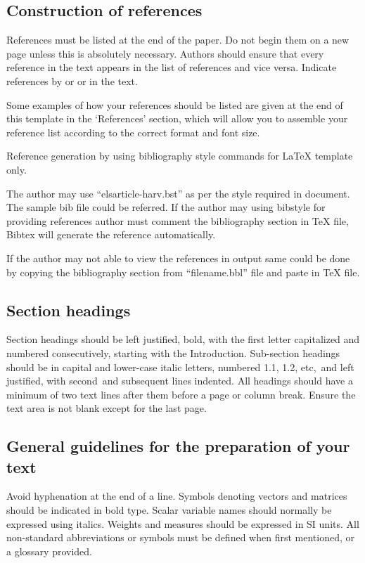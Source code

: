 \documentclass[5p,times,procedia]{elsarticle}
\begin{document}

\subsection{ Construction of references}

References must be listed at the end of the paper. Do not begin them on a new page unless this is absolutely necessary. Authors should ensure that every reference in the text appears in the list of references and vice versa. Indicate references by \cite{clark} or \cite{Deal} or \cite{Fachinger2006} in the text. 

Some examples of how your references should be listed are given at the end of this template in the `References' section, which will allow you to assemble your reference list according to the correct format and font size.

Reference generation by using bibliography style commands for LaTeX template only.

The author may use ``elsarticle-harv.bst'' as per the style required in document. The sample bib file could be referred. 
If the author may using bibstyle for providing references author must comment the bibliography section in TeX file, Bibtex will generate the reference automatically.

If the author may not able to view the references in output same could be done by copying the bibliography section from ``filename.bbl'' file and paste in TeX file.



\subsection{Section headings}
Section headings should be left justified, bold, with the first letter capitalized and numbered consecutively, starting with the Introduction. Sub-section headings should be in capital and lower-case italic letters, numbered 1.1, 1.2, etc,~and left justified, with second~and subsequent lines indented. All headings should have a minimum of two text lines after them before a page or column break.
Ensure the text area is not blank except for the last page.

\subsection{General guidelines for the preparation of your text}
Avoid hyphenation at the end of a line. Symbols denoting vectors and matrices should be indicated in bold type. Scalar variable names should normally be expressed using italics. Weights and measures should be expressed in SI units. All non-standard abbreviations or symbols must be defined when first mentioned, or a glossary provided.
\end{document}
